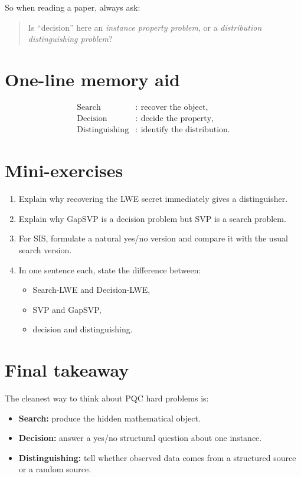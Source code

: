 \documentclass[11pt]{article}
\begin{document}
	So when reading a paper, always ask:
	
	\begin{quote}
		Is ``decision'' here an \emph{instance property problem}, or a \emph{distribution distinguishing problem}?
	\end{quote}
	
	\section{One-line memory aid}
	
	\[
	\boxed{
		\begin{aligned}
			\text{Search} &:\ \text{recover the object},\\
			\text{Decision} &:\ \text{decide the property},\\
			\text{Distinguishing} &:\ \text{identify the distribution}.
		\end{aligned}
	}
	\]
	
	\section{Mini-exercises}
	
	\begin{enumerate}
		\item Explain why recovering the LWE secret immediately gives a distinguisher.
		\item Explain why GapSVP is a decision problem but SVP is a search problem.
		\item For SIS, formulate a natural yes/no version and compare it with the usual search version.
		\item In one sentence each, state the difference between:
		\begin{itemize}
			\item Search-LWE and Decision-LWE,
			\item SVP and GapSVP,
			\item decision and distinguishing.
		\end{itemize}
	\end{enumerate}
	
	\section{Final takeaway}
	
	The cleanest way to think about PQC hard problems is:
	
	\begin{itemize}
		\item \textbf{Search:} produce the hidden mathematical object.
		\item \textbf{Decision:} answer a yes/no structural question about one instance.
		\item \textbf{Distinguishing:} tell whether observed data comes from a structured source or a random source.
	\end{itemize}
	
\end{document}
